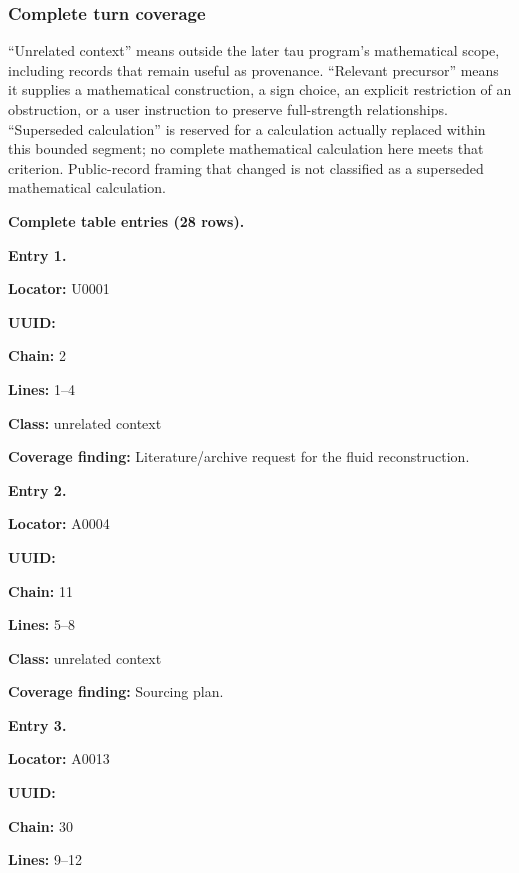 \documentclass[10pt,a4paper,oneside]{report}
\begin{document}
\subsubsection{Complete turn coverage}\label{complete-turn-coverage}

``Unrelated context'' means outside the later tau program's mathematical
scope, including records that remain useful as provenance. ``Relevant
precursor'' means it supplies a mathematical construction, a sign
choice, an explicit restriction of an obstruction, or a user instruction
to preserve full-strength relationships. ``Superseded calculation'' is
reserved for a calculation actually replaced within this bounded
segment; no complete mathematical calculation here meets that criterion.
Public-record framing that changed is not classified as a superseded
mathematical calculation.

\textbf{Complete table entries (28 rows).}


\textbf{Entry 1.}

\textbf{Locator:} U0001

\textbf{UUID:} \protect{}

\textbf{Chain:} 2

\textbf{Lines:} 1--4

\textbf{Class:} unrelated context

\textbf{Coverage finding:} Literature/archive request for the fluid
reconstruction.


\textbf{Entry 2.}

\textbf{Locator:} A0004

\textbf{UUID:} \protect{}

\textbf{Chain:} 11

\textbf{Lines:} 5--8

\textbf{Class:} unrelated context

\textbf{Coverage finding:} Sourcing plan.


\textbf{Entry 3.}

\textbf{Locator:} A0013

\textbf{UUID:} \protect{}

\textbf{Chain:} 30

\textbf{Lines:} 9--12
\end{document}
